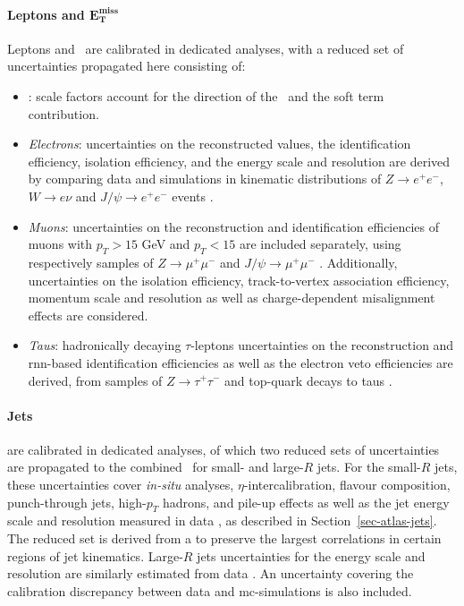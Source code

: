 \newpage
\paragraph{Leptons and $\boldsymbol{E_T^{\text{miss}}}$} Leptons and \etm\ are calibrated in dedicated analyses, with a reduced set of uncertainties propagated here consisting of:
\begin{itemize}[leftmargin=*]
    \item \textit{\etm}: scale factors account for the direction of the \etm\ and the soft term contribution. 
    \item \textit{Electrons}: uncertainties on the reconstructed values, the identification efficiency, isolation efficiency, and the energy scale and resolution are derived by comparing data and simulations in kinematic distributions of $Z \rightarrow e^+ e^-$, $W\rightarrow e\nu$ and $J/\psi \rightarrow e^+e^-$ events \Cite{Aaboud:2657964}. 
    \item \textit{Muons}: uncertainties on the reconstruction and identification efficiencies of muons with $p_T > 15$ GeV and $p_T < 15$ are included separately, using respectively samples of $Z\rightarrow \mu^+\mu^-$ and $J/\psi \rightarrow \mu^+\mu^-$ \cite{Aad:2746302}. Additionally, uncertainties on the isolation efficiency, track-to-vertex association efficiency, momentum scale and resolution as well as charge-dependent misalignment effects are considered. 
    \item \textit{Taus}: hadronically decaying $\tau$-leptons uncertainties on the reconstruction and \gls{rnn}-based identification efficiencies as well as the electron veto efficiencies are derived, from samples of $Z\rightarrow\tau^+ \tau^-$ and top-quark decays to taus \cite{ATL-PHYS-PUB-2019-033, ATL-PHYS-PUB-2015-045, ATLAS-CONF-2017-029}.
\end{itemize}

\paragraph{Jets} are calibrated in dedicated analyses, of which two reduced sets of uncertainties are propagated to the combined \vhbc\ for small- and large-$R$ jets. For the small-$R$ jets, these uncertainties cover \textit{in-situ} analyses, $\eta$-intercalibration, flavour composition, punch-through jets, high-$p_T$ hadrons, and pile-up effects as well as the jet energy scale and resolution measured in data \cite{ATLASjesjerMeas, Aad:2854733}, as described in Section~\ref{sec-atlas-jets}. The reduced set is derived from a  to preserve the largest correlations in certain regions of jet kinematics. Large-$R$ jets uncertainties for the energy scale and resolution are similarly estimated from data \cite{ATLAS:2018bip}. An uncertainty covering the calibration discrepancy between data and \gls{mc}-simulations is also included.

